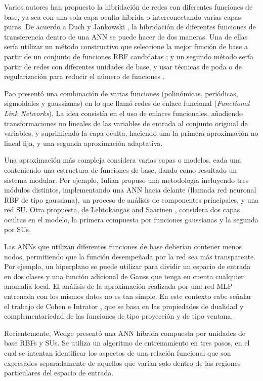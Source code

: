 Varios autores han propuesto la hibridación de redes con diferentes funciones de base, ya
sea con una sola capa oculta híbrida o interconectando varias capas puras. De acuerdo a
Duch y Jankowski \cite{Duch2001}, la hibridación de diferentes funciones de transferencia
dentro de una ANN se puede hacer de dos maneras. Una de ellas sería utilizar un método
constructivo que seleccione la mejor función de base a partir de un conjunto de funciones
RBF candidatas \cite{Duch2001a}; y un segundo método
sería partir de redes con diferentes unidades de base, y usar técnicas de poda o de
regularización para reducir el número de funciones \cite{Duch2001, Jankowski2001}.

Pao \cite{Pao1992} presentó una combinación de varias funciones (polinómicas, periódicas,
sigmoidales y gaussianas) en lo que llamó redes de enlace funcional (\textit{Functional
Link Networks}). La idea consistía en el uso de enlaces funcionales, añadiendo
transformaciones no lineales de las variables de entrada al conjunto original de variables,
y suprimiendo la capa oculta, haciendo una la primera aproximación no lineal fija, y una
segunda aproximación adaptativa.

Una aproximación más compleja considera varias capas o modelos, cada una conteniendo una
estructura de funciones de base, dando como resultado un sistema modular. Por ejemplo,
Iulian
\cite{Iulian2002} propuso una metodología incluyendo tres módulos distintos, implementando
una ANN hacia delante (llamada red neuronal RBF de tipo gaussiana), un proceso de
análisis de componentes principales, y una red SU. Otra
propuesta, de Lehtokangas and Saarinen \cite{Lehtokangas1998}, considera dos capas ocultas
en el modelo, la primera compuesta por funciones gaussianas y la segunda por SUs.

Las ANNs que utilizan diferentes funciones de base deberían contener
menos nodos, permitiendo que la función desempeñada por la red sea
más transparente. Por ejemplo, un hiperplano se puede utilizar para dividir
un espacio de entrada en dos clases y una función adicional de Gauss
que tenga en cuenta cualquier anomalía local. El análisis de la aproximación realizada
por una red MLP entrenada con los mismos datos no es tan simple. En este contexto cabe
señalar el trabajo de Cohen e Intrator \cite{Cohen2002a}, que se basa en las propiedades
de dualidad y complementariedad de las funciones de tipo proyección y de tipo ventana.

Recientemente, Wedge \cite{Wedge2006} presentó una ANN
híbrida compuesta por unidades de base RBFs y SUs. Se utiliza un algoritmo de
entrenamiento en tres pasos, en el cual se intentan identificar los aspectos de
una relación funcional que son expresados separadamente de aquellos que varían solo dentro
de las regiones particulares del espacio de entrada.

